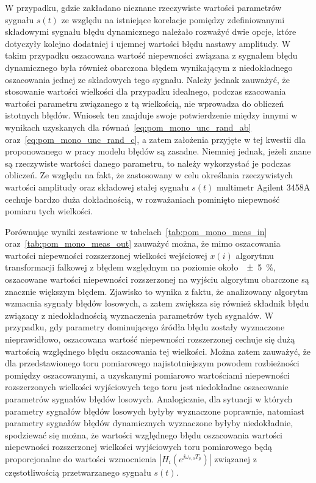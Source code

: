 W przypadku, gdzie zakładano nieznane rzeczywiste wartości parametrów sygnału $s(t)$ ze względu na istniejące korelacje pomiędzy zdefiniowanymi składowymi sygnału błędu dynamicznego należało rozważyć dwie opcje, które dotyczyły kolejno dodatniej i ujemnej wartości błędu nastawy amplitudy. W takim przypadku oszacowana wartość niepewności związana z sygnałem błędu dynamicznego była również obarczona błędem wynikającym z niedokładnego oszacowania jednej ze składowych tego sygnału. Należy jednak zauważyć, że stosowanie wartości wielkości dla przypadku idealnego, podczas szacowania wartości parametru związanego z tą wielkością, nie wprowadza do obliczeń istotnych błędów. Wniosek ten znajduje swoje potwierdzenie między innymi w wynikach uzyskanych dla równań~\eqref{eq:pom_mono_unc_rand_ab} oraz~\eqref{eq:pom_mono_unc_rand_c}, a zatem założenia przyjęte w tej kwestii dla proponowanego w pracy modelu błędów są zasadne. Niemniej jednak, jeżeli znane są rzeczywiste wartości danego parametru, to należy wykorzystać je podczas obliczeń. Ze względu na fakt, że zastosowany w celu określania rzeczywistych wartości amplitudy oraz składowej stałej sygnału $s(t)$ multimetr Agilent 3458A cechuje bardzo duża dokładnością, w rozważaniach pominięto niepewność pomiaru tych wielkości.

Porównując wyniki zestawione w tabelach~\ref{tab:pom_mono_meas_in} oraz~\ref{tab:pom_mono_meas_out} zauważyć można, że mimo oszacowania wartości niepewności rozszerzonej wielkości wejściowej $x(i)$ algorytmu transformacji falkowej z błędem względnym na poziomie około~\qty{\pm 5}{\percent}, oszacowane wartości niepewności rozszerzonej na wyjściu algorytmu obarczone są znacznie większym błędem. Zjawisko to wynika z faktu, że analizowany algorytm wzmacnia sygnały błędów losowych, a zatem zwiększa się również składnik błędu związany z niedokładnością wyznaczenia parametrów tych sygnałów. W przypadku, gdy parametry dominującego źródła błędu zostały wyznaczone nieprawidłowo, oszacowana wartość niepewności rozszerzonej cechuje się dużą wartością względnego błędu oszacowania tej wielkości. Można zatem zauważyć, że dla przedstawionego toru pomiarowego najistotniejszym powodem rozbieżności pomiędzy oszacowanymi, a uzyskanymi pomiarowo wartościami niepewności rozszerzonych wielkości wyjściowych tego toru jest niedokładne oszacowanie parametrów sygnałów błędów losowych. Analogicznie, dla sytuacji w których parametry sygnałów błędów losowych byłyby wyznaczone poprawnie, natomiast parametry sygnałów błędów dynamicznych wyznaczone byłyby niedokładnie, spodziewać się można, że wartości względnego błędu oszacowania wartości niepewności rozszerzonej wielkości wyjściowych toru pomiarowego będą proporcjonalne do wartości wzmocnienia $|H_{i}(e^{j \omega_{s,o} T_{p}})|$ związanej z częstotliwością przetwarzanego sygnału $s(t)$.

